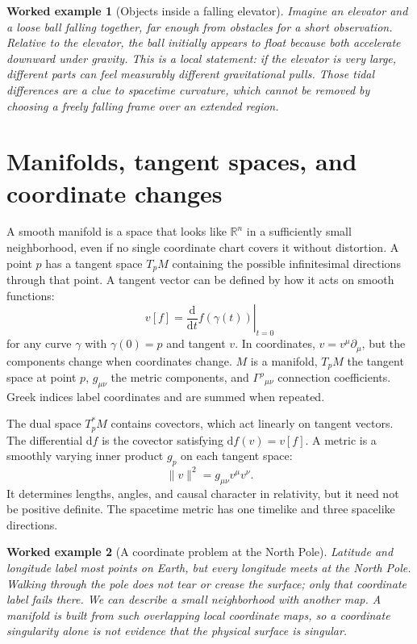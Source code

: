 \documentclass[11pt,oneside]{book}
\newcommand{\dd}{\mathrm{d}}
\theoremstyle{reviewstyle}
\newtheorem{example}{Worked example}[chapter]
\begin{document}
\begin{example}[Objects inside a falling elevator]
Imagine an elevator and a loose ball falling together, far enough from obstacles for a short observation. Relative to the elevator, the ball initially appears to float because both accelerate downward under gravity. This is a local statement: if the elevator is very large, different parts can feel measurably different gravitational pulls. Those tidal differences are a clue to spacetime curvature, which cannot be removed by choosing a freely falling frame over an extended region.
\end{example}

\section{Manifolds, tangent spaces, and coordinate changes}
A smooth manifold is a space that looks like $\mathbb R^n$ in a sufficiently small neighborhood, even if no single coordinate chart covers it without distortion. A point $p$ has a tangent space $T_pM$ containing the possible infinitesimal directions through that point. A tangent vector can be defined by how it acts on smooth functions:
\begin{equation}
v[f]=\left.\frac{\dd}{\dd t}f(\gamma(t))\right|_{t=0}
\end{equation}
for any curve $\gamma$ with $\gamma(0)=p$ and tangent $v$. In coordinates, $v=v^\mu\partial_\mu$, but the components change when coordinates change. $M$ is a manifold, $T_pM$ the tangent space at point $p$, $g_{\mu\nu}$ the metric components, and $\Gamma^\rho{}_{\mu\nu}$ connection coefficients. Greek indices label coordinates and are summed when repeated.

The dual space $T_p^*M$ contains covectors, which act linearly on tangent vectors. The differential $\dd f$ is the covector satisfying $\dd f(v)=v[f]$. A metric is a smoothly varying inner product $g_p$ on each tangent space:
\begin{equation}
\lVert v\rVert^2=g_{\mu\nu}v^\mu v^\nu.
\end{equation}
It determines lengths, angles, and causal character in relativity, but it need not be positive definite. The spacetime metric has one timelike and three spacelike directions.

\begin{example}[A coordinate problem at the North Pole]
Latitude and longitude label most points on Earth, but every longitude meets at the North Pole. Walking through the pole does not tear or crease the surface; only that coordinate label fails there. We can describe a small neighborhood with another map. A manifold is built from such overlapping local coordinate maps, so a coordinate singularity alone is not evidence that the physical surface is singular.
\end{example}
\end{document}
